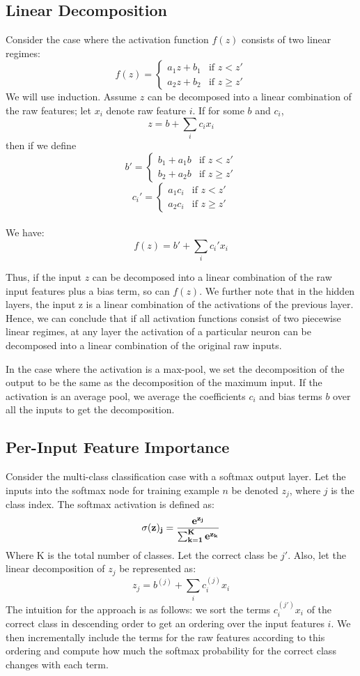 \documentclass{article}
\begin{document}
\subsection{Linear Decomposition}

Consider the case where the activation function $f(z)$ consists of two linear regimes:\\
$$f(z)=\begin{cases}
a_1z + b_1 & \text{if } z < z'\\
a_2z + b_2 & \text{if } z \geq z'
\end{cases}$$
We will use induction. Assume $z$ can be decomposed into a linear combination of the raw features; let $x_i$ denote raw feature $i$. If for some $b$ and $c_i$,
$$z = b + \sum_i c_i x_i$$
then if we define\\
$$b'=\begin{cases}
b_1 + a_1b & \text{if } z < z'\\
b_2 + a_2b & \text{if } z \geq z'
\end{cases}$$
$$c_i'=\begin{cases}
a_1c_i & \text{if } z < z'\\
a_2c_i & \text{if } z \geq z'
\end{cases}$$\\
We have:
$$f(z)=b' + \sum_i c_i' x_i$$

Thus, if the input $z$ can be decomposed into a linear combination of the raw input features plus a bias term, so can $f(z)$. We further note that in the hidden layers, the input z is a linear combination of the activations of the previous layer. Hence, we can conclude that if all activation functions consist of two piecewise linear regimes, at any layer the activation of a particular neuron can be decomposed into a linear combination of the original raw inputs.

In the case where the activation is a max-pool, we set the decomposition of the output to be the same as the decomposition of the maximum input. If the activation is an average pool, we average the coefficients $c_i$ and bias terms $b$ over all the inputs to get the decomposition.

\subsection{Per-Input Feature Importance}

Consider the multi-class classification case with a softmax output layer. Let the inputs into the softmax node for training example $n$ be denoted $z_j$, where $j$ is the class index. The softmax activation is defined as:
$$\sigma(\bf{z})_j = \frac{e^{z_j}}{\sum_{k=1}^K e^{z_k}}$$
Where K is the total number of classes. Let the correct class be $j'$. Also, let the linear decomposition of $z_j$ be represented as:
$$z_j = b^{(j)} + \sum_i c^{(j)}_i x_i$$
The intuition for the approach is as follows: we sort the terms $c^{(j')}_ix_i$ of the correct class in descending order to get an ordering over the input features $i$. We then incrementally include the terms for the raw features according to this ordering and compute how much the softmax probability for the correct class changes with each term.
\end{document}
